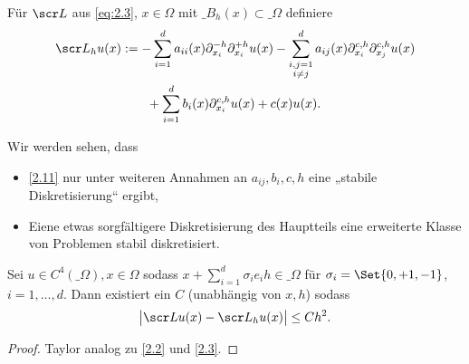 \begin{df}[FD-Approximation] \label{2.11}
	Für $\scr L$ aus \eqref{eq:2.3}, $x \in \Omega$ mit $\_B_h(x)  \subset \_\Omega$ definiere
	\begin{equation} \setcounter{equation}{5} \label{eq:2.5}
		\begin{aligned}
			\scr L_h u(x)
			&:= - \sum_{i=1}^d a_{ii} (x) \partial_{x_i}^{-h} \partial_{x_i}^{+h} u(x)
			- \sum_{\substack{i,j=1 \\ i\neq j}}^d a_{ij} (x) \partial_{x_i}^{c,h} \partial_{x_j}^{c,h} u(x) \\
			&\qquad + \sum_{i=1}^d b_i(x) \partial_{x_i}^{c,h} u(x)	+ c(x) u(x).
		\end{aligned}
	\end{equation}
	\begin{note}
		Wir werden sehen, dass
		\begin{itemize}
			\item
				\ref{2.11} nur unter weiteren Annahmen an $a_{ij}, b_i, c, h$ eine „stabile Diskretisierung“ ergibt,
			\item
				Eiene etwas sorgfältigere Diskretisierung des Hauptteils eine erweiterte Klasse von Problemen stabil diskretisiert.
		\end{itemize}
	\end{note}
\end{df}

\begin{st} \label{2.12}
	Sei $u \in C^4(\_\Omega), x \in \Omega$ sodass $x + \sum_{i=1}^d \sigma_i e_i h \in \_\Omega$ für $\sigma_i = \Set{0,+1, -1}$, $i = 1, \dotsc, d$.
	Dann existiert ein $C$ (unabhängig von $x,h$) sodass
	\[
		\big|\scr L u(x) - \scr L_h u(x)\big| \le C h^2.
	\]
	\begin{proof}
		Taylor analog zu \ref{2.2} und \ref{2.3}.
	\end{proof}
\end{st}

